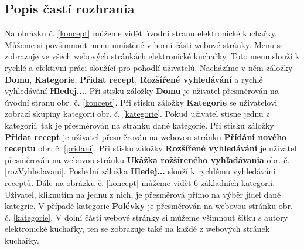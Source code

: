 \documentclass[12pt,a4paper,titlepage,final]{article}
\begin{document}
\subsection{Popis častí rozhrania}
Na obrázku č. \ref{koncept} můžeme vidět úvodní stranu elektronické kuchařky. Můžeme si povšimnout menu umístěné v horní části webové stránky. Menu se zobrazuje ve všech webových stránkách elektronické kuchařky. Toto menu slouží k rychlé a efektivní práci sloužící pro pohodlí uživatelů. Nacházíme v něm záložky \textbf{Domu}, \textbf{Kategorie}, \textbf{Přidat recept}, \textbf{Rozšířené vyhledávání} a rychlé vyhledávání \textbf{Hledej...}. \newline
Při stisku záložky \textbf{Domu} je uživatel přesměrován na úvodní stranu obr. č. \ref{koncept}.\newline
Při stisku záložky \textbf{Kategorie} se uživatelovi zobrazí skupiny kategorií obr. č. \ref{kategorie}. Pokud uživatel stisne jednu z kategorií, tak je přesměrován na stránku dané kategorie.\newline
Při stisku záložky \textbf{Přidat recept} je uživatel přesměrován na webovou stránku \textbf{Přídání nového receptu} obr. č. \ref{pridani}.\newline
Při stisku záložky \textbf{Rozšířené vyhledávání} je uživatel přesměrován na webovou stránku \textbf{Ukážka rožšíreného vyhľadávania} obr. č. \ref{rozVyhledavani}.\newline
Poslední záložka \textbf{Hledej...} slouží k rychlému vyhledávání receptů.\newline
Dále na obrázku č. \ref{koncept} můžeme vidět 6 základních kategorií. Uživatel, kliknutím na jednu z nich, je přesměrová přímo na výběr jídel dané kategrie. V případě kategorie \textbf{Polévky} je přesměrován na webovou stránku obr. č. \ref{kategorie}.\newline
V dolní části webové stránky si můžeme všimnout šítku s autory elektronické kuchařky, ten se zobrazuje také na každé z webových stránek kuchařky.\newline
\end{document}
